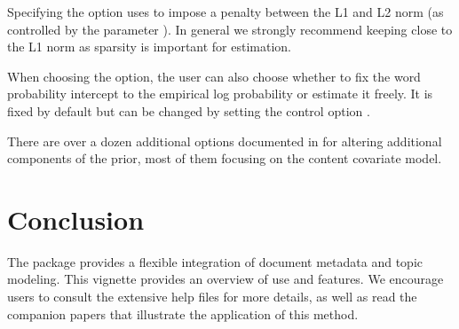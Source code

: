 \documentclass[nojss]{jss}
\begin{document}
Specifying the option  uses  to impose a penalty between the L1 and L2 norm (as controlled by the  parameter ).  In general we strongly recommend keeping close to the L1 norm as sparsity is important for estimation.

When choosing the  option, the user can also choose whether to fix the word probability intercept to the empirical log probability or estimate it freely.  It is fixed by default but can be changed by setting the control option .  

There are over a dozen additional options documented in  for altering additional components of the prior, most of them focusing on the content covariate model.  

\section{Conclusion}

The   package provides a flexible integration of document metadata and topic modeling. This vignette provides an overview of use and features. We encourage users to consult the extensive help files for more details, as well as read the companion papers that illustrate the application of this method.

\clearpage
{}

\end{document}
